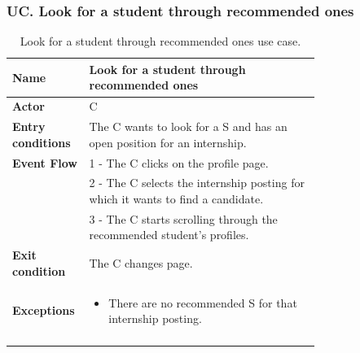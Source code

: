\subsubsection*{UC\cuc . Look for a student through recommended ones}
\begin{center}
    \begin{longtable}{|l|p{0.75\linewidth}|}
        \hline
        \textbf{Name}               & Look for a student through recommended ones\\
        \hline
        \textbf{Actor}              & C\\
        \hline
        \textbf{Entry conditions}   & The C wants to look for a S and has an open position for an internship.\\
        \hline
        \textbf{Event Flow}         & 1 - The C clicks on the profile page. \\
        & 2 - The C selects the internship posting for which it wants to find a candidate. \\
        & 3 - The C starts scrolling through the recommended student’s profiles. \\
        \hline
        \textbf{Exit condition}   & The C changes page. \\       
        \hline
        \textbf{Exceptions}       & \begin{itemize}
            \item There are no recommended S for that internship posting.
        \end{itemize}\\
        \hline
        \caption{Look for a student through recommended ones use case.}
        \label{tab: look_for_student_use_case}
    \end{longtable}
\end{center}



